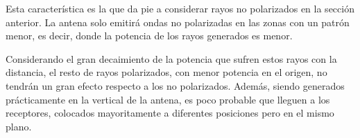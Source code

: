 Esta característica es la que da pie a considerar rayos no polarizados en la sección anterior.
La antena solo emitirá ondas no polarizadas en las zonas con un patrón menor, es decir, donde la potencia de los rayos generados es menor.

Considerando el gran decaimiento de la potencia que sufren estos rayos con la distancia, el resto de rayos polarizados, con menor potencia en el origen, no tendrán un gran efecto respecto a los no polarizados.
Además, siendo generados prácticamente en la vertical de la antena, es poco probable que lleguen a los receptores, colocados mayoritamente a diferentes posiciones pero en el mismo plano.

